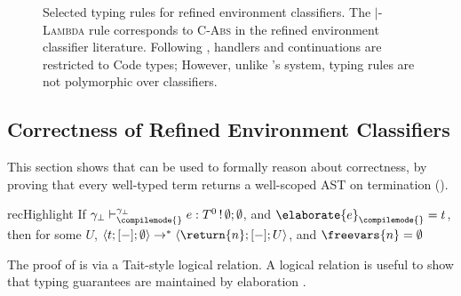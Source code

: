 \begin{figure}
\begin{rec-desc}
\begin{center}
\end{center}
\end{rec-desc}

\caption{Selected typing rules for refined environment classifiers. The \compilemode{}$\mid$\quotemode{}-\textsc{Lambda} rule corresponds to \textsc{C-Abs} in the refined environment classifier literature. Following \citeauthor{isoda-24}, handlers and continuations are restricted to \textsf{Code} types; However, unlike \citeauthor{isoda-24}'s system, typing rules are not polymorphic over classifiers.}
\label{fig:refined-env-classifiers-source-typing-rules}
\end{figure}

\subsection{Correctness of Refined Environment Classifiers}\label{subsection:rec-formal-correctness}
This section shows that \recLang{} can be used to formally reason about correctness, by proving that every well-typed \recLang{} term returns a well-scoped AST on termination (). 

\begin{theorem}{recHighlight}\label{thm:refined-env-classifiers-correct}
If $\gamma_\bot \vdash ^{\gamma_\bot}_{\compilemode{}} e: T^0 \, ! \, \emptyset ; \emptyset $, and $\elaborate{e}_{\compilemode{}} = t$, \\
\noindent{}then for some $U$, $\langle t;[-]; \emptyset \rangle \to^{*} \langle \return{n}; [-] ; U \rangle$, and $\freevars{n} = \emptyset$
\end{theorem}

The proof of  is via a Tait-style logical relation. A logical relation is useful to show that typing guarantees are maintained by elaboration \citep{benton-09}.


